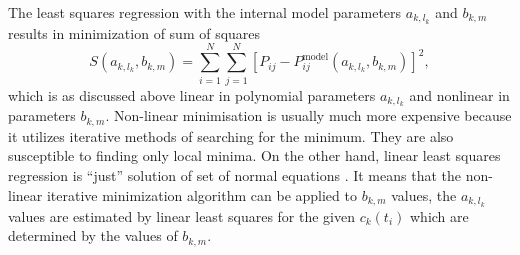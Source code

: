 The least squares regression with the internal model parameters $a_{k,l_k}$ and
$b_{k,m}$ results in minimization of sum of squares
\begin{equation*}
	S(a_{k,l_k},b_{k,m}) = \sum_{i=1}^N{\sum_{j=1}^N{
		\left[P_{ij} - P_{ij}^\text{model}(a_{k,l_k},b_{k,m})\right]^2
	}},
\end{equation*}
which is as discussed above linear in polynomial parameters $a_{k,l_k}$ and
nonlinear in parameters $b_{k,m}$.
Non-linear minimisation is usually much more expensive because it utilizes
iterative methods of searching for the minimum.
They are also susceptible to finding only local minima.
On the other hand, linear least squares regression is “just” solution of set
of normal equations
\parencite{NumericalRecipes}.
It means that the non-linear iterative minimization algorithm can be applied
to $b_{k,m}$ values, the $a_{k,l_k}$ values are estimated by linear least
squares for the given $c_k(t_i)$ which are determined by the values of
$b_{k,m}$.
